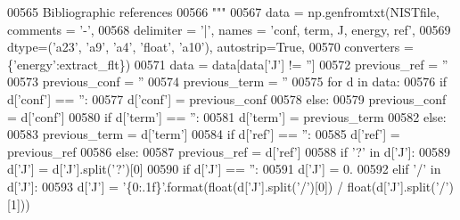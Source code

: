 \begin{DoxyCode}
00565 \textcolor{stringliteral}{        Bibliographic references}
00566 \textcolor{stringliteral}{    """}
00567     data = np.genfromtxt(NISTfile, comments = \textcolor{stringliteral}{'-'}, 
00568                     delimiter = \textcolor{stringliteral}{'|'}, names = \textcolor{stringliteral}{'conf, term, J, energy, ref'}, 
00569                     dtype=(\textcolor{stringliteral}{'a23'}, \textcolor{stringliteral}{'a9'}, \textcolor{stringliteral}{'a4'}, \textcolor{stringliteral}{'float'}, \textcolor{stringliteral}{'a10'}), autostrip=\textcolor{keyword}{True},
00570                     converters = \{\textcolor{stringliteral}{'energy'}:extract\_flt\})
00571     data = data[data[\textcolor{stringliteral}{'J'}] != \textcolor{stringliteral}{''}]
00572     previous\_ref = \textcolor{stringliteral}{''}
00573     previous\_conf = \textcolor{stringliteral}{''}
00574     previous\_term = \textcolor{stringliteral}{''}
00575     \textcolor{keywordflow}{for} d \textcolor{keywordflow}{in} data:
00576         \textcolor{keywordflow}{if} d[\textcolor{stringliteral}{'conf'}] == \textcolor{stringliteral}{''}:
00577             d[\textcolor{stringliteral}{'conf'}] = previous\_conf
00578         \textcolor{keywordflow}{else}:
00579             previous\_conf = d[\textcolor{stringliteral}{'conf'}]
00580         \textcolor{keywordflow}{if} d[\textcolor{stringliteral}{'term'}] == \textcolor{stringliteral}{''}:
00581             d[\textcolor{stringliteral}{'term'}] = previous\_term
00582         \textcolor{keywordflow}{else}:
00583             previous\_term = d[\textcolor{stringliteral}{'term'}]
00584         \textcolor{keywordflow}{if} d[\textcolor{stringliteral}{'ref'}] == \textcolor{stringliteral}{''}:
00585             d[\textcolor{stringliteral}{'ref'}] = previous\_ref
00586         \textcolor{keywordflow}{else}:
00587             previous\_ref = d[\textcolor{stringliteral}{'ref'}]
00588         \textcolor{keywordflow}{if} \textcolor{stringliteral}{'?'} \textcolor{keywordflow}{in} d[\textcolor{stringliteral}{'J'}]:
00589             d[\textcolor{stringliteral}{'J'}] = d[\textcolor{stringliteral}{'J'}].split(\textcolor{stringliteral}{'?'})[0]
00590         \textcolor{keywordflow}{if} d[\textcolor{stringliteral}{'J'}] == \textcolor{stringliteral}{''}:
00591             d[\textcolor{stringliteral}{'J'}] = 0.
00592         \textcolor{keywordflow}{elif} \textcolor{stringliteral}{'/'} \textcolor{keywordflow}{in} d[\textcolor{stringliteral}{'J'}]:
00593             d[\textcolor{stringliteral}{'J'}] = \textcolor{stringliteral}{'\{0:.1f\}'}.format(float(d[\textcolor{stringliteral}{'J'}].split(\textcolor{stringliteral}{'/'})[0]) / float(d[\textcolor{stringliteral}{'J'}].split(\textcolor{stringliteral}{'/'})[1]))

\end{DoxyCode}
